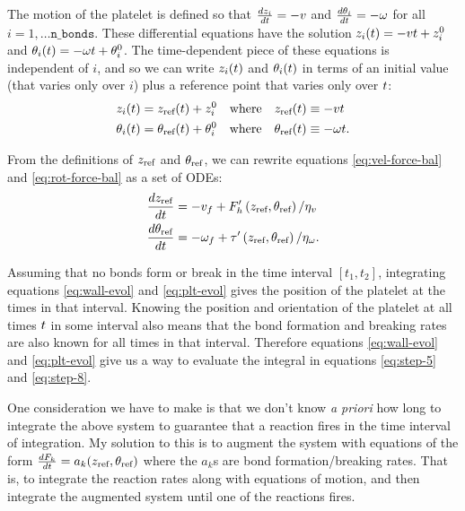 \documentclass{article}
\newcommand{\dd}{d}
\newcommand{\Der}[2]{\frac{\dd #1}{\dd #2}}
\newcommand{\tn}{\textnormal}
\begin{document}
The motion of the platelet is defined so that
$\Der{\ndWallDist_i}{\dTime} = -\ndVelocity$ and
$\Der{\recAngle_i}{\dTime} = -\ndRotation$ for all $i = 1, \hdots
\mathtt{n\_bonds}$. These differential equations have the solution
$z_i(t) = -v t + z_i^0$ and
$\theta_i(t) = -\omega t + \theta_i^0$. The
time-dependent piece of these equations is independent of $i$, and so
we can write $z_i(t)$ and $\theta_i(t)$ in
terms of an initial value (that varies only over $i$) plus a reference
point that varies only over $t$:
\begin{align}
  \ndWallDist_i(t) &= \ndWallDist_\tn{ref}(\dTime) + \ndWallDist_i^0
                     \quad \tn{where} \quad
                     \ndWallDist_\tn{ref}(\dTime) \equiv
                     -\ndVelocity\dTime \\
  \recAngle_i(t) &= \recAngle_\tn{ref}(\dTime) + \recAngle_i^0 \quad
                   \tn{where} \quad \recAngle_\tn{ref}(\dTime) \equiv
                   -\ndRotation \dTime.
\end{align}

From the definitions of $\ndWallDist_\tn{ref}$ and
$\recAngle_\tn{ref}$, we can rewrite equations
\eqref{eq:vel-force-bal} and \eqref{eq:rot-force-bal} as a set of
ODEs:
\begin{align}
  \label{eq:wall-evol}
  \Der{\ndWallDist_\tn{ref}}{\dTime}
  &= -\ndAppliedVel + F_h'\left(\ndWallDist_\tn{ref},
    \recAngle_\tn{ref} \right)/\ndVelFriction \\
  \label{eq:plt-evol}
  \Der{\recAngle_\tn{ref}}{\dTime}
  &= -\ndAppliedRot + \tau'\left(\ndWallDist_\tn{ref},
    \recAngle_\tn{ref} \right)/\ndRotFriction.
\end{align}

Assuming that no bonds form or break in the time interval
$[t_1, t_2]$, integrating equations \eqref{eq:wall-evol} and
\eqref{eq:plt-evol} gives the position of the platelet at the times in
that interval. Knowing the position and orientation of the platelet at
all times $t$ in some interval also means that the bond formation
and breaking rates are also known for all times in that
interval. Therefore equations \eqref{eq:wall-evol} and
\eqref{eq:plt-evol} give us a way to evaluate the integral in
equations \eqref{eq:step-5} and \eqref{eq:step-8}.

One consideration we have to make is that we don't know \emph{a
  priori} how long to integrate the above system to guarantee that a
reaction fires in the time interval of integration. My solution to
this is to augment the system with equations of the form
$\Der{F_k}{\dTime} = a_k(\ndWallDist_\tn{ref}, \recAngle_\tn{ref})$
where the $a_k$s are bond formation/breaking rates. That is, to
integrate the reaction rates along with equations of motion, and
then integrate the augmented system until one of the reactions fires.
\end{document}
